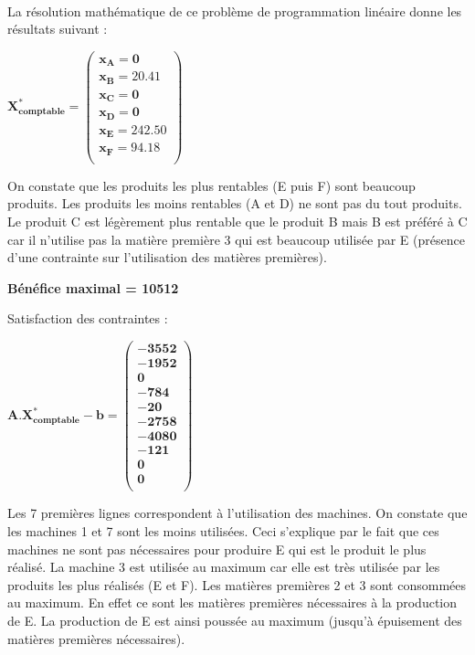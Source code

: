 \documentclass[12pt]{article}
\begin{document}
\\
La résolution mathématique de ce problème de programmation linéaire donne les résultats suivant :\\
\begin{center}
$\mathbf{X^{*}_{comptable} = 
   \left (
   \begin{array}{c}
      x_{A} = 0 \\
      x_{B} = 20.41 \\
      x_{C} = 0 \\
      x_{D} = 0 \\
      x_{E} = 242.50 \\
      x_{F} = 94.18 \\
   \end{array}
   \right )
 } $ 
\end{center}
On constate que les produits les plus rentables (E puis F) sont beaucoup produits. Les produits
les moins rentables (A et D) ne sont pas du tout produits. Le produit C est légèrement plus rentable que le produit B mais B est préféré à C car il n'utilise pas la matière première 3 qui est beaucoup utilisée par E (présence d'une contrainte sur l'utilisation des matières premières).
\\
\begin{center}
\textbf{Bénéfice maximal = 10512}
\end{center}

Satisfaction des contraintes : 
\begin{center}
$\mathbf{A.X^{*}_{comptable} - b = 
   \left (
   \begin{array}{c}
      -3552 \\
      -1952 \\
      0 \\
      -784 \\
      -20 \\
      -2758 \\
      -4080 \\
      -121 \\
      0 \\
      0\\
   \end{array}
   \right )
 } $ 
\end{center}
Les 7 premières lignes correspondent à l’utilisation des machines. On constate que les
machines 1 et 7 sont les moins utilisées. Ceci s’explique par le fait que ces machines ne sont
pas nécessaires pour produire E qui est le produit le plus réalisé. La machine 3 est utilisée au maximum car elle est très utilisée par les produits les plus réalisés (E et F). Les matières premières 2 et 3 sont consommées au maximum. En effet ce sont les matières premières nécessaires à la production de E. La production de E est ainsi poussée au maximum (jusqu'à épuisement des matières premières nécessaires).
\end{document}
